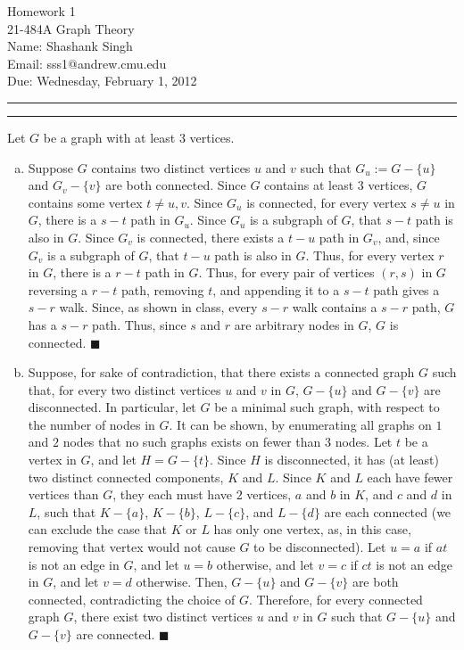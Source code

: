 \documentclass[11pt]{article}
\makeatletter
\newcounter{questionCounter}
\newcounter{partCounter}[questionCounter]
\newenvironment{question}[2][\arabic{questionCounter}]{%
    \setcounter{partCounter}{0}%
    \vspace{.25in} \hrule \vspace{0.5em}%
        \noindent{\bf #2}%
    \vspace{0.8em} \hrule \vspace{.10in}%
    \addtocounter{questionCounter}{1}%
}{}
\newcommand{\myname}{Shashank Singh}
\newcommand{\myandrew}{sss1@andrew.cmu.edu}
\newcommand{\myclass}{21-484A Graph Theory}
\newcommand{\myhwnum}{1}
\newcommand{\duedate}{Wednesday, February 1, 2012}
\makeatother
\begin{document}
\thispagestyle{plain}

{\Large Homework \myhwnum} \\
\myclass \\
Name: \myname \\
Email: \myandrew \\
Due: \duedate

\begin{question}{Problem 1} Let $G$ be a graph with at least $3$ vertices.
\begin{enumerate}[(a)]
\item Suppose $G$ contains two distinct vertices $u$ and $v$ such that
$G_u := G - \{u\}$ and $G_v - \{v\}$ are both connected. Since $G$ contains at
least $3$ vertices, $G$ contains some vertex $t \neq u, v$. Since $G_u$ is
connected, for every vertex $s \neq u$ in $G$, there is a $s-t$ path in $G_u$.
Since $G_u$ is a subgraph of $G$, that $s-t$ path is also in $G$. Since $G_v$
is connected, there exists a $t-u$ path in $G_v$, and, since $G_v$ is a
subgraph of $G$, that $t-u$ path is also in $G$. Thus, for every vertex $r$ in
$G$, there is a $r-t$ path in $G$. Thus, for every pair of vertices $(r,s)$ in
$G$ reversing a $r-t$ path, removing $t$, and appending it to a $s-t$ path
gives a $s-r$ walk. Since, as shown in class, every $s-r$ walk contains a
$s-r$ path, $G$ has a $s-r$ path. Thus, since $s$ and $r$ are arbitrary nodes
in $G$, $G$ is connected. \qquad $\blacksquare$ \\

\item Suppose, for sake of contradiction, that there exists a connected graph
$G$ such that, for every two distinct vertices $u$ and $v$ in $G$, $G- \{u\}$
and
$G - \{v\}$ are disconnected. In particular, let $G$ be a minimal such graph,
with respect to the number of nodes in $G$. It can be shown, by enumerating
all graphs on $1$ and $2$ nodes that no such graphs exists on fewer than $3$
nodes. Let $t$ be a vertex in $G$, and let $H = G - \{t\}$. Since $H$ is
disconnected, it has (at least) two distinct connected components, $K$ and
$L$. Since $K$ and $L$ each have fewer vertices than $G$, they each must have
$2$ vertices, $a$ and $b$ in $K$, and $c$ and $d$ in $L$, such that
$K - \{a\}$, $K - \{b\}$, $L - \{c\}$, and $L - \{d\}$ are each connected
(we can exclude the case that $K$ or $L$ has only one vertex, as, in this
case, removing that vertex would not cause $G$ to be disconnected).
Let $u = a$ if $at$ is not an edge in $G$, and let $u = b$ otherwise, and let
$v = c$ if $ct$ is not an edge in $G$, and let $v = d$ otherwise. Then,
$G - \{u\}$ and $G - \{v\}$ are both connected, contradicting the choice of
$G$. Therefore, for every connected graph $G$, there exist two distinct
vertices $u$ and $v$ in $G$ such that $G - \{u\}$ and $G - \{v\}$ are
connected. \qquad $\blacksquare$ \\


\end{enumerate}
\end{question}
\end{document}
